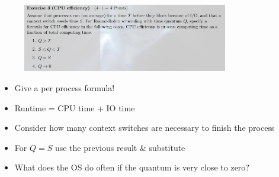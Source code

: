 \documentclass[10pt]{beamer}
\begin{document}
\begin{frame}[allowframebreaks]{}
         \begin{figure}
          \includegraphics[keepaspectratio, width=0.8\textwidth, height=0.8\textheight-2\baselineskip-2\baselineskip]{img/102_ex3.png} \\
        \end{figure}
        \begin{itemize}
         \item Give a per process formula!
         \item Runtime = CPU time + IO time
         \item Consider how many context switches are necessary to finish the process
         \item For $Q=S$ use the previous result \& substitute
         \item What does the OS do often if the quantum is very close to zero?
        \end{itemize}
        \framebreak 
        

\end{frame}
\end{document}
